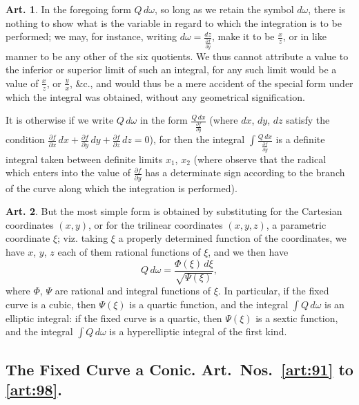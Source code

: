 \documentclass[12pt,a4paper]{article}
\theoremstyle{definition}
\newtheorem{art}{Art.}[section]
\begin{document}
\begin{art}\label{art:89}
In the foregoing form $Q\,d\omega$, so long as we retain the symbol $d\omega$, there is nothing to show what is the variable in regard to which the integration is to be performed; we may, for instance, writing $d\omega = \frac{dz}{\frac{\partial f}{\partial y}}$, make it to be $\frac{x}{z}$, or in like manner to be any other of the six quotients. We thus cannot attribute a value to the inferior or superior limit of such an integral, for any such limit would be a value of $\frac{x}{z}$, or $\frac{y}{x}$, \&c., and would thus be a mere accident of the special form under which the integral was obtained, without any geometrical signification.

It is otherwise if we write $Q\,d\omega$ in the form $\frac{Q\,dx}{\frac{\partial f}{\partial y}}$ (where $dx$, $dy$, $dz$ satisfy the condition $\frac{\partial f}{\partial x}\,dx + \frac{\partial f}{\partial y}\,dy + \frac{\partial f}{\partial z}\,dz = 0$), for then the integral $\int \frac{Q\,dx}{\frac{\partial f}{\partial y}}$ is a definite integral taken between definite limits $x_1$, $x_2$ (where observe that the radical which enters into the value of $\frac{\partial f}{\partial y}$ has a determinate sign according to the branch of the curve along which the integration is performed).
\end{art}

\newpage
\begin{art}\label{art:90}
But the most simple form is obtained by substituting for the Cartesian coordinates $(x, y)$, or for the trilinear coordinates $(x, y, z)$, a parametric coordinate $\xi$; viz. taking $\xi$ a properly determined function of the coordinates, we have $x$, $y$, $z$ each of them rational functions of $\xi$, and we then have
\[
Q\,d\omega = \frac{\Phi(\xi)\,d\xi}{\sqrt{\Psi(\xi)}},
\]
where $\Phi$, $\Psi$ are rational and integral functions of $\xi$. In particular, if the fixed curve is a cubic, then $\Psi(\xi)$ is a quartic function, and the integral $\int Q\,d\omega$ is an elliptic integral: if the fixed curve is a quartic, then $\Psi(\xi)$ is a sextic function, and the integral $\int Q\,d\omega$ is a hyperelliptic integral of the first kind.
\end{art}

\subsection*{The Fixed Curve a Conic. Art.~Nos.~\ref{art:91} to \ref{art:98}.}
\end{document}
